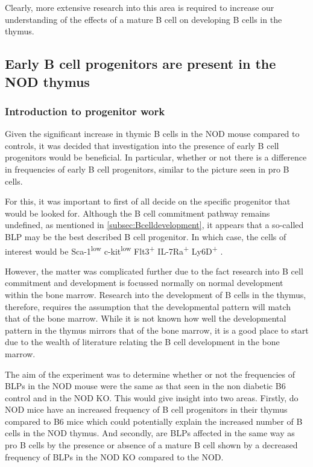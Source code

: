 Clearly, more extensive research into this area is required to increase our understanding of the effects of a mature B cell on developing B cells in the thymus.


\subsection{Early B cell progenitors are present in the NOD thymus}
\label{subsec:earlyprogens}

\subsubsection{Introduction to progenitor work}

Given the significant increase in thymic B cells in the NOD mouse compared to controls, it was decided that investigation into the presence of early B cell progenitors would be beneficial.
In particular, whether or not there is a difference in frequencies of early B cell progenitors, similar to the picture seen in pro B cells.

For this, it was important to first of all decide on the specific progenitor that would be looked for.
Although the B cell commitment pathway remains undefined, as mentioned in \cref{subsec:Bcelldevelopment}, it appears that a so-called BLP may be the best described B cell progenitor.
In which case, the cells of interest would be Sca-1\textsuperscript{low} c-kit\textsuperscript{low} Flt3\textsuperscript{+} IL-7Ra\textsuperscript{+} Ly6D\textsuperscript{+} \citep{Mansson2010, Inlay2009, Zhang2013}.

However, the matter was complicated further due to the fact research into B cell commitment and development is focussed normally on normal development within the bone marrow.
Research into the development of B cells in the thymus, therefore, requires the assumption that the developmental pattern will match that of the bone marrow.
While it is not known how well the developmental pattern in the thymus mirrors that of the bone marrow, it is a good place to start due to the wealth of literature relating the B cell development in the bone marrow.

The aim of the experiment was to determine whether or not the frequencies of BLPs in the NOD mouse were the same as that seen in the non diabetic B6 control and in the NOD KO.
This would give insight into two areas.
Firstly, do NOD mice have an increased frequency of B cell progenitors in their thymus compared to B6 mice which could potentially explain the increased number of B cells in the NOD thymus.
And secondly, are BLPs affected in the same way as pro B cells by the presence or absence of a mature B cell shown by a decreased frequency of BLPs in the NOD KO compared to the NOD.

